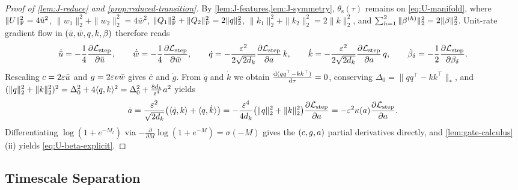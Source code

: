 \begin{proof}[Proof of \cref{lem:J-reduce} and \cref{prop:reduced-transition}]
By \cref{lem:J-features,lem:J-symmetry}, $\theta_{\mathrm s}(\tau)$ remains on \cref{eq:U-manifold}, where $\|U\|_{\mathrm{F}}^2 = 4\bar u^2$, $\|w_1\|_2^2 + \|w_2\|_2^2 = 4\bar w^2$, $\|Q_1\|_{\mathrm{F}}^2 + \|Q_2\|_{\mathrm{F}}^2 = 2\|q\|_2^2$, $\|k_1\|_2^2 + \|k_2\|_2^2 = 2\|k\|_2^2$, and $\sum_{h=1}^2 \|\beta^{(h)}\|_2^2 = 2\|\beta\|_2^2$. Unit-rate gradient flow in $(\bar u, \bar w, q, k, \beta)$ therefore reads
\[
 \dot{\bar u} = -\frac{1}{4}\pd{\Lstep}{\bar u}, \qquad
 \dot{\bar w} = -\frac{1}{4}\pd{\Lstep}{\bar w}, \qquad
 \dot q = -\frac{\initscale^2}{2\sqrt{2d_k}}\pd{\Lstep}{a}\,k, \qquad
 \dot k = -\frac{\initscale^2}{2\sqrt{2d_k}}\pd{\Lstep}{a}\,q, \qquad
 \dot\brel_\delta = -\frac{1}{2}\pd{\Lstep}{\brel_\delta}.
\]
Rescaling $c = 2\varepsilon\bar u$ and $g = 2\varepsilon v\bar w$ gives $\dot{c}$ and $\dot g$. From $\dot q$ and $\dot k$ we obtain $\ddtau{(qq^\top - kk^\top)} = 0$, conserving $\Delta_0 = \|qq^\top - kk^\top\|_*$, and $(\|q\|_2^2 + \|k\|_2^2)^2 = \Delta_0^2 + 4\langle q, k\rangle^2 = \Delta_0^2 + \frac{8d_k}{\varepsilon^4}a^2$ yields
\[
 \dot a = \frac{\initscale^2}{\sqrt{2d_k}}\bigl(\langle\dot q, k\rangle + \langle q, \dot k\rangle\bigr) = -\frac{\initscale^4}{4d_k}\bigl(\|q\|_2^2 + \|k\|_2^2\bigr)\pd{\Lstep}{a} = -\initscale^2\kappa(a)\pd{\Lstep}{a}.
\]
Differentiating $\log(1 + e^{-M_t})$ via $-\frac{\partial}{\partial M}\log(1 + e^{-M}) = \sigma(-M)$ gives the $(c, g, a)$ partial derivatives directly, and \cref{lem:gate-calculus}(ii) yields \cref{eq:U-beta-explicit}.
\end{proof}

\subsection{Timescale Separation}
\label{app:J-timescales}
\label{tab:J-speeds}

